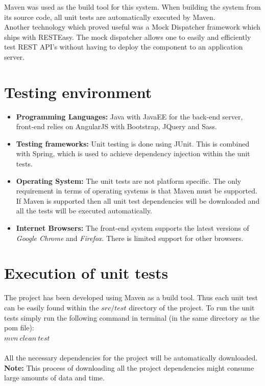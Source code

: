 \documentclass[11pt,a4paper]{article}
\begin{document}
Maven was used as the build tool for this system. When building the system from its source code, all unit tests are automatically executed by Maven.  \\

Another technology which proved useful was a Mock Dispatcher framework which ships with RESTEasy. The mock dispatcher allows one to easily and efficiently test REST API's without having to deploy the component to an application server.

\section{Testing environment}
\begin{itemize}
	\item \textbf{Programming Languages:} Java with JavaEE for the back-end server, front-end relies on AngularJS with Bootstrap, JQuery and Sass.
	
	\item \textbf{Testing frameworks: } Unit testing is done using JUnit. This is combined with Spring, which is used to achieve dependency injection within the unit tests.
	
	\item \textbf{Operating System: } The unit tests are not platform specific. The only requirement in terms of operating systems is that Maven must be supported. If Maven is supported then all unit test dependencies will be downloaded and all the tests will be executed automatically.
	
	\item \textbf{Internet Browsers: } The front-end system supports the latest versions of 
	\textit{Google Chrome} and \textit{Firefox}. There is limited support for other browsers.
\end{itemize}

\section{Execution of unit tests}	
The project has been developed using Maven as a build tool. Thus each unit test can be easily found within the $src/test$ directory of the project. To run the unit tests simply run the following command in terminal (in the same directory as the pom file): \\

$mvn\ clean\ test$ \\\\
All the necessary dependencies for the project will be automatically downloaded.\\ \textbf{Note:} This process of downloading all the project dependencies might consume large amounts of data and time.
\end{document}
